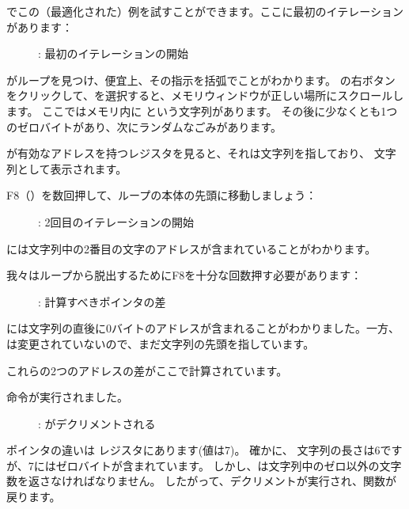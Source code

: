 ﻿\clearpage
{}
\myindex{\olly}

\olly でこの（最適化された）例を試すことができます。ここに最初のイテレーションがあります：

\begin{figure}[H]
\centering
{}
\caption{\olly: 最初のイテレーションの開始}
\label{fig:strlen_olly_1}
\end{figure}

\olly がループを見つけ、便宜上、その指示を括弧でことがわかります。 
\EAX の右ボタンをクリックして、を選択すると、メモリウィンドウが正しい場所にスクロールします。
ここではメモリ内に という文字列があります。
その後に少なくとも1つのゼロバイトがあり、次にランダムなごみがあります。

\olly が有効なアドレスを持つレジスタを見ると、それは文字列を指しており、
文字列として表示されます。

\clearpage
F8（\stepover）を数回押して、ループの本体の先頭に移動しましょう：

\begin{figure}[H]
\centering
{}
\caption{\olly: 2回目のイテレーションの開始}
\label{fig:strlen_olly_2}
\end{figure}

\EAX には文字列中の2番目の文字のアドレスが含まれていることがわかります。

\clearpage

我々はループから脱出するためにF8を十分な回数押す必要があります：

\begin{figure}[H]
\centering
{}
\caption{\olly: 計算すべきポインタの差}
\label{fig:strlen_olly_3}
\end{figure}

\EAX には文字列の直後に0バイトのアドレスが含まれることがわかりました。一方、
\EDX は変更されていないので、まだ文字列の先頭を指しています。

これらの2つのアドレスの差がここで計算されています。

\clearpage
\SUB 命令が実行されました。

\begin{figure}[H]
\centering
{}
\caption{\olly: \EAX がデクリメントされる}
\label{fig:strlen_olly_4}
\end{figure}

ポインタの違いは \EAX レジスタにあります(値は7)。
確かに、 文字列の長さは6ですが、7にはゼロバイトが含まれています。
しかし、は文字列中のゼロ以外の文字数を返さなければなりません。
したがって、デクリメントが実行され、関数が戻ります。
